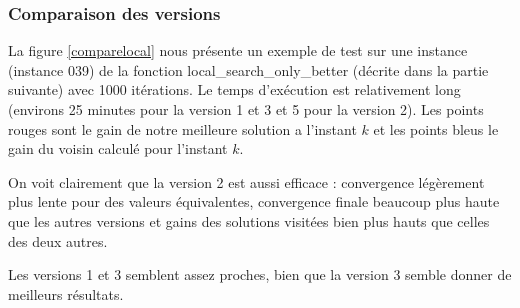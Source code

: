 \documentclass[10pt,a4paper]{article}
\begin{document}
\subsubsection{Comparaison des versions}

La figure \ref{comparelocal} nous présente un exemple de test sur une instance (instance 039) de la fonction local\_search\_only\_better (décrite dans la partie suivante) avec 1000 itérations. Le temps d’exécution est relativement long (environs 25 minutes pour la version 1 et 3 et 5 pour la version 2). Les points rouges sont le gain de notre meilleure solution a l'instant $k$ et les points bleus le gain du voisin calculé pour l'instant $k$.

On voit clairement que la version 2 est aussi efficace : convergence légèrement plus lente pour des valeurs équivalentes, convergence finale beaucoup plus haute que les autres versions et gains des solutions visitées bien plus hauts que celles des deux autres. 

Les versions 1 et 3 semblent assez proches, bien que la version 3 semble donner de meilleurs résultats.
\end{document}
